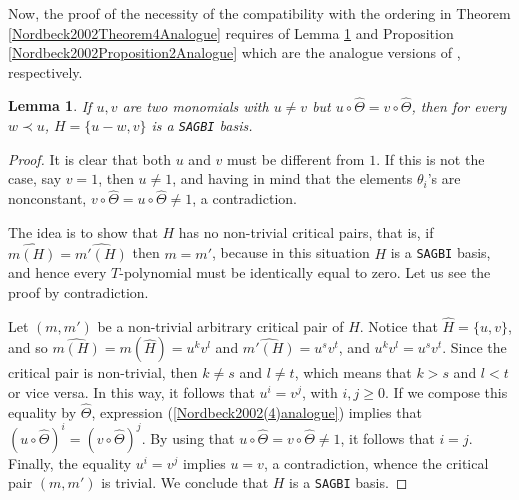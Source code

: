 \documentclass{amsart}
\newtheorem{lemma}[theorem]{Lemma}
\theoremstyle{definition}
\theoremstyle{remark}
\numberwithin{equation}{section}
\begin{document}
Now, the proof of the necessity of the compatibility with the ordering in Theorem \ref{Nordbeck2002Theorem4Analogue} requires of Lemma \ref{Nordbeck2002Lemma3Analogue} and Proposition \ref{Nordbeck2002Proposition2Analogue} which are the analogue versions of \cite[Lemma 3 and Proposition 2]{Nordbeck2002}, respectively.

\begin{lemma}\label{Nordbeck2002Lemma3Analogue}
If $u, v$ are two monomials  with $u\neq v$ but $u\circ \widehat{\Theta} = v\circ \widehat{\Theta}$, then for every $w\prec u$, $H = \{u - w, v\}$ is a {\rm \texttt{SAGBI}} basis.
\end{lemma}
\begin{proof}
It is clear that both $u$ and $v$ must be different from $1$. If this is not the case, say $v = 1$, then $u\neq 1$, and having in mind that the elements $\theta_i$'s are nonconstant, $v\circ \widehat{\Theta} = u\circ \widehat{\Theta} \neq 1$, a contradiction.

The idea is to show that $H$ has no non-trivial critical pairs, that is, if $\widehat{m(H)} = \widehat{m'(H)}$ then $m = m'$, because in this situation $H$ is a \texttt{SAGBI} basis, and hence every $T$-polynomial must be identically equal to zero. Let us see the proof by contradiction.

Let $(m, m')$ be a non-trivial arbitrary critical pair of $H$. Notice that $\widehat{H} = \{u, v\}$, and so $\widehat{m(H)} = m(\widehat{H}) = u^k v^l$ and $\widehat{m'(H)} = u^s v^t$, and $u^k v^l = u^s v^t$. Since the critical pair is non-trivial, then $k\neq s$ and $l\neq t$, which means that $k > s$ and $l < t$ or vice versa. In this way, it follows that $u^{i} = v^{j}$, with $i, j \ge 0$. If we compose this equality by $\widehat{\Theta}$, expression (\ref{Nordbeck2002(4)analogue}) implies that $(u\circ \widehat{\Theta})^{i} = (v\circ \widehat{\Theta})^{j}$. By using that $u\circ \widehat{\Theta} = v\circ \widehat{\Theta} \neq 1$, it follows that $i = j$. Finally, the equality $u^{i} = v^{j}$ implies $u = v$, a contradiction, whence the critical pair $(m, m')$ is trivial. We conclude that $H$ is a \texttt{SAGBI} basis.
\end{proof}
\end{document}
